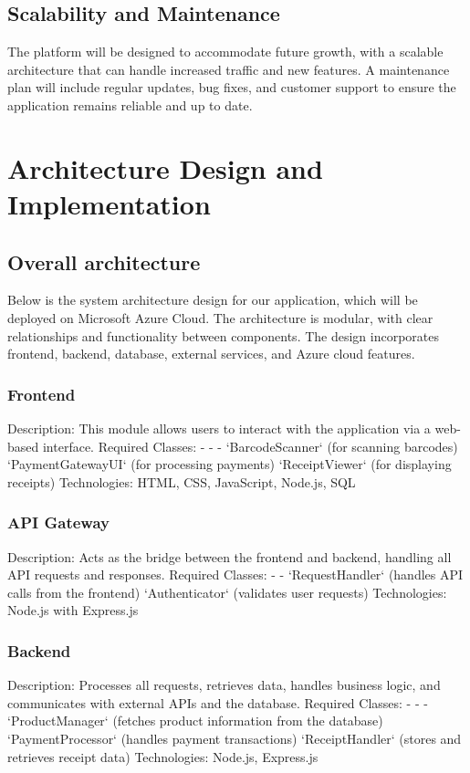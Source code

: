 \documentclass[conference]{IEEEtran}
\begin{document}
\subsection{Scalability and Maintenance}
The platform will be designed to accommodate future growth, with a scalable architecture that can handle increased traffic and new features. A maintenance plan will include regular updates, bug fixes, and customer support to ensure the application remains reliable and up to date.

\section{Architecture Design and Implementation}

\subsection{Overall architecture}
Below is the system architecture design for our application, which will be deployed on 
Microsoft Azure Cloud. The architecture is modular, with clear relationships and 
functionality between components. The design incorporates frontend, backend, 
database, external services, and Azure cloud features. 

\subsubsection{Frontend}
Description: This module allows users to interact with the application via a web-based 
interface. 
Required Classes: - - - 
`BarcodeScanner` (for scanning barcodes) 
`PaymentGatewayUI` (for processing payments) 
`ReceiptViewer` (for displaying receipts) 
Technologies: HTML, CSS, JavaScript, Node.js, SQL 
\subsubsection{API Gateway }
Description: Acts as the bridge between the frontend and backend, handling all API 
requests and responses. 
Required Classes: - - 
`RequestHandler` (handles API calls from the frontend) 
`Authenticator` (validates user requests) 
Technologies: Node.js with Express.js 
\subsubsection{Backend}
Description: Processes all requests, retrieves data, handles business logic, and 
communicates with external APIs and the database. 
Required Classes: - - - 
`ProductManager` (fetches product information from the database) 
`PaymentProcessor` (handles payment transactions) 
`ReceiptHandler` (stores and retrieves receipt data) 
Technologies: Node.js, Express.js 
\end{document}
